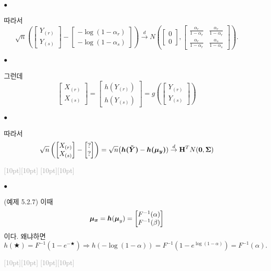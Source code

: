 \documentclass[12pt,oneside,english]{book}
\newcommand{\rdash}{\noindent \textcolor{darkgray}{ \raisebox{-1.9pt}[10pt][10pt]{\leafright} \hrulefill \raisebox{-1.9pt}[10pt][10pt]{\leafright \decofourleft \decothreeleft  \aldineright \decotwo \floweroneleft \decoone}}}
\def\ck{\paragraph{\Large$\bullet$}\Large}
\newcommand{\bs}[1]{\mbox{\boldmath $#1$}}
\newcommand{\bfH}{\mbox{$\bf{H}$}}
\begin{document}
\ck 따라서 
\[
\sqrt{n}\left(\begin{bmatrix}Y_{(r)} \\ Y_{(s)}\end{bmatrix}-\begin{bmatrix}-\log(1-\alpha_r) \\ -\log(1-\alpha_s)\end{bmatrix}\right)\overset{d}{\to} N\left(\begin{bmatrix}0\\0\end{bmatrix},\begin{bmatrix} \frac{\alpha_r}{1-\alpha_r} & \frac{\alpha_r}{1-\alpha_r} \\ \frac{\alpha_r}{1-\alpha_r} & \frac{\alpha_s}{1-\alpha_s} \end{bmatrix}\right).
\]


\ck 그런데 
\[
\begin{bmatrix} X_{(r)}\\ X_{(s)} \end{bmatrix}=\begin{bmatrix} h(Y_{(r)})\\  h(Y_{(s)}) \end{bmatrix}=g\left(\begin{bmatrix}Y_{(r)} \\ Y_{(s)}\end{bmatrix}\right)
\]

\ck 따라서 
\[
\sqrt{n}\left(\begin{bmatrix}X_{(r)} \\ X_{(s)}\end{bmatrix}-\begin{bmatrix}? \\ ? \end{bmatrix}\right) 
=\sqrt{n}\big(\bs{h(\tilde Y)}-\bs{h(\mu_y)}) 
\overset{d}{\to} \bfH^T N({\bs 0},{\bs \Sigma})
\]

\rdash

\ck (예제 5.2.7) 이때 
\[
\bs{\mu_x}=\bs{h}(\bs{\mu}_y)=\begin{bmatrix} F^{-1}(\alpha)\\ F^{-1}(\beta) \end{bmatrix}
\]
이다. 왜냐하면 
\[
h(\bigstar)=F^{-1}(1-e^{-\bigstar}) \Longrightarrow h(-\log(1-\alpha))=F^{-1}(1-e^{\log(1-\alpha)})=F^{-1}(\alpha).
\]

\rdash 
\end{document}
